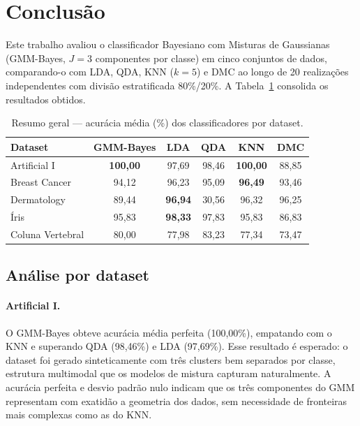 
\section{Conclusão}

Este trabalho avaliou o classificador Bayesiano com Misturas de Gaussianas (GMM-Bayes,
$J=3$ componentes por classe) em cinco conjuntos de dados, comparando-o com LDA, QDA,
KNN ($k=5$) e DMC ao longo de 20 realizações independentes com divisão estratificada
80\%/20\%. A Tabela~\ref{tab:resumo_geral} consolida os resultados obtidos.

\begin{table}[htbp]
  \centering
  \caption{Resumo geral — acurácia média (\%) dos classificadores por dataset.}
  \label{tab:resumo_geral}
  \begin{tabular}{lccccc}
    \hline
    \textbf{Dataset}      & \textbf{GMM-Bayes} & \textbf{LDA}  & \textbf{QDA}  & \textbf{KNN}  & \textbf{DMC}  \\
    \hline
    Artificial I          & \textbf{100,00}    & 97,69         & 98,46         & \textbf{100,00} & 88,85       \\
    Breast Cancer         & 94,12              & 96,23         & 95,09         & \textbf{96,49}  & 93,46       \\
    Dermatology           & 89,44              & \textbf{96,94} & 30,56        & 96,32         & 96,25       \\
    Íris                  & 95,83              & \textbf{98,33} & 97,83        & 95,83         & 86,83       \\
Coluna Vertebral      & 80,00              & 77,98         & 83,23         & 77,34        & 73,47        \\
    \hline
  \end{tabular}
\end{table}

\subsection*{Análise por dataset}

\paragraph{Artificial I.}
O GMM-Bayes obteve acurácia média perfeita (100,00\%), empatando com o KNN e superando
QDA (98,46\%) e LDA (97,69\%). Esse resultado é esperado: o dataset foi gerado sinteticamente
com três clusters bem separados por classe, estrutura multimodal que os modelos de mistura
capturam naturalmente. A acurácia perfeita e desvio padrão nulo indicam que os três
componentes do GMM representam com exatidão a geometria dos dados, sem necessidade de
fronteiras mais complexas como as do KNN.

